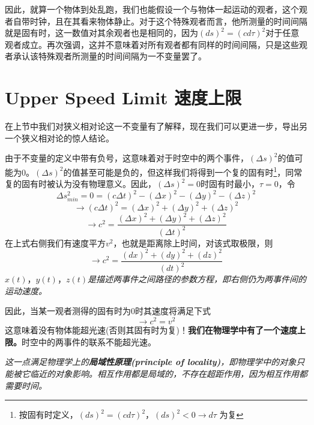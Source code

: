 因此，就算一个物体到处乱跑，我们也能假设一个与物体一起运动的观者，这个观者自带时钟，且在其看来物体静止。对于这个特殊观者而言，他所测量的时间间隔就是固有时，这一数值对其余观者也是相同的，因为$(ds)^2=(cd\tau)^2$对于任意观者成立。再次强调，这并不意味着对所有观者都有同样的时间间隔，只是这些观者承认该特殊观者所测量的时间间隔为一不变量罢了。

\section[速度上限]{Upper Speed Limit 速度上限}
\label{sec2.3}
在上节中我们对狭义相对论这一不变量有了解释，现在我们可以更进一步，导出另一个狭义相对论的惊人结论。

由于不变量的定义中带有负号，这意味着对于时空中的两个事件，$(\Delta s)^2$的值可能为0。$(\Delta s)^2$的值甚至可能是负的，但这样我们将得到一个复的固有时\footnote{按固有时定义，$(ds)^2=(cd\tau)^2$，$(ds)^2 < 0 \rightarrow d\tau$ 为复}，同常复的固有时被认为没有物理意义。因此，$(\Delta s)^2=0$时固有时最小，$\tau=0$，令
\[
\Delta s^2_{min}
=0=(c \Delta t)^2-(\Delta x)^2-(\Delta y)^2-(\Delta z)^2
\]
\[
\rightarrow (c \Delta t)^2
=(\Delta x)^2+(\Delta y)^2+(\Delta z)^2
\]
\begin{equation}\label{eq2.20}
 \rightarrow c^2=
  \frac{(\Delta x)^2+(\Delta y)^2+(\Delta z)^2}{(\Delta t)^2}
\end{equation}
在上式右侧我们有速度平方$v^2$，也就是距离除上时间，对该式取极限，则
\begin{equation}\label{eq2.21}
 \rightarrow c^2=\frac{(d x)^2+(d y)^2+(d z)^2}{(dt)^2}
\end{equation}
$x(t)$，$y(t)$，$z(t)${\it{是描述两事件之间路径的参数方程，即右侧仍为两事件间的运动速度。}}%

因此，当某一观者测得的固有时为0时其速度将满足下式
\begin{equation}\label{eq2.22}
  \rightarrow c^2 =v^2
\end{equation}
这意味着没有物体能超光速(否则其固有时为复)！{\bf{我们在物理学中有了一个速度上限。}}时空中的两事件的联系不能超光速。

{\it{这一点满足物理学上的{\bf{局域性原理(principle of locality)}}，即物理学中的对象只能被它临近的对象影响。相互作用都是局域的，不存在超距作用，因为相互作用都需要时间。}}

